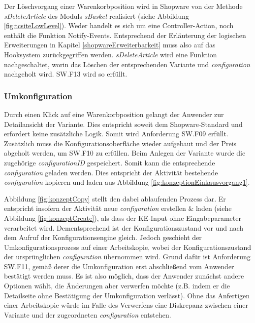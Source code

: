 \documentclass[11pt, a4paper, titlepage, listof=totoc, bibliography=totoc, index=totoc, twoside, openright, headings=normal]{scrreprt}
\begin{document}
Der Löschvorgang einer Warenkorbposition wird in Shopware von der Methode \emph{sDeleteArticle} des Moduls \emph{sBasket} realisiert (siehe Abbildung \ref{fig:tcsiteLowLevel}). Weder handelt es sich um eine Controller-Action, noch enthält die Funktion Notify-Events. Entsprechend der Erläuterung der logischen Erweiterungen in Kapitel \ref{shopwareErweiterbarkeit} muss also auf das Hooksystem zurückgegriffen werden. \emph{sDeleteArticle} wird eine Funktion nachgeschaltet, worin das Löschen der entsprechenden Variante und \emph{configuration} nachgeholt wird. SW.F13 wird so erfüllt.

\subsubsection*{Umkonfiguration}
Durch einen Klick auf eine Warenkorbposition gelangt der Anwender zur Detailansicht der Variante. Dies entspricht soweit dem Shopware-Standard und erfordert keine zusätzliche Logik. Somit wird Anforderung SW.F09 erfüllt. Zusätzlich muss die Konfigurationsoberfläche wieder aufgebaut und der Preis abgeholt werden, um SW.F10 zu erfüllen. Beim Anlegen der Variante wurde die zugehörige \emph{configurationID} gespeichert. Somit kann die entsprechende \emph{configuration} geladen werden. Dies entspricht der Aktivität \glqq bestehende \emph{configuration} kopieren und laden\grqq{} aus Abbildung \ref{fig:konzeptionEinkausvorgang1}.

Abbildung \ref{fig:konzeptCopy} stellt den dabei ablaufenden Prozess dar. Er entspricht insofern der Aktivität \glqq neue \emph{configuration} erstellen \& laden\grqq{} (siehe Abbildung \ref{fig:konzeptCreate}), als dass der KE-Input ohne Eingabeparameter verarbeitet wird. Dementsprechend ist der Konfigurationszustand vor und nach dem Aufruf der Konfigurationsengine gleich. Jedoch geschieht der Umkonfigurationsprozess auf einer Arbeitskopie, wobei der Konfigurationszustand der ursprünglichen \emph{configuration} übernommen wird. Grund dafür ist Anforderung SW.F11, gemäß derer die Umkonfiguration erst abschließend vom Anwender bestätigt werden muss. Es ist also möglich, dass der Anwender zunächst andere Optionen wählt, die Änderungen aber verwerfen möchte (z.B. indem er die Detailseite ohne Bestätigung der Umkonfiguration verlässt). Ohne das Anfertigen einer Arbeitskopie würde im Falle des Verwerfens eine Diskrepanz zwischen einer Variante und der zugeordneten \emph{configuration} entstehen.
\end{document}
